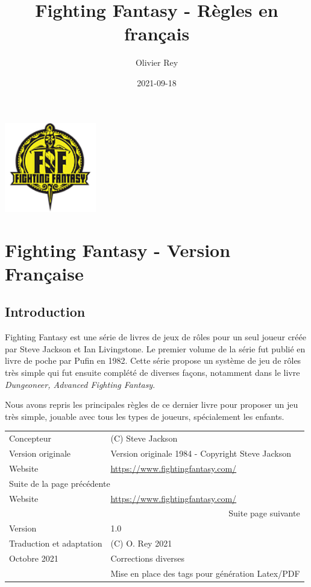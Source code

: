 \documentclass[a4paper, 11pt, twoside]{article}
\author{Olivier Rey}
\date{2021-09-18}
\title{Fighting Fantasy - Règles en français}
\begin{document}
\maketitle
\tableofcontents

\newpage

\begin{center}
\includegraphics[width=4cm]{FF2018.png}
\end{center}

\section{Fighting Fantasy - Version Française}
\label{sec:org0ff5f1c}

\subsection{Introduction}
\label{sec:org2bb5439}

Fighting Fantasy est une série de livres de jeux de rôles pour un seul joueur créée par Steve Jackson et Ian Livingstone. Le premier volume de la série fut publié en livre de poche par Pufin en 1982. Cette série propose un système de jeu de rôles très simple qui fut ensuite complété de diverses façons, notamment dans le livre \emph{Dungeoneer, Advanced Fighting Fantasy}.

Nous avons repris les principales règles de ce dernier livre pour proposer un jeu très simple, jouable avec tous les types de joueurs, spécialement les enfants.

\begin{longtable}{|l|l|}
\hline
Concepteur & (C) Steve Jackson\\
Version originale & Version originale 1984 - Copyright Steve Jackson\\
Website & \href{https://www.fightingfantasy.com/}{https://www.fightingfantasy.com/}\\
\hline
\endfirsthead
\multicolumn{2}{l}{Suite de la page précédente} \\

Website & \href{https://www.fightingfantasy.com/}{https://www.fightingfantasy.com/} \\

\hline
\endhead
\hline\multicolumn{2}{r}{Suite page suivante} \\
\endfoot
\endlastfoot
\hline
Version & 1.0\\
\hline
Traduction et adaptation & (C) O. Rey 2021\\
Octobre 2021 & Corrections diverses\\
 & Mise en place des tags pour génération Latex/PDF\\
\hline
\end{longtable}
\end{document}
